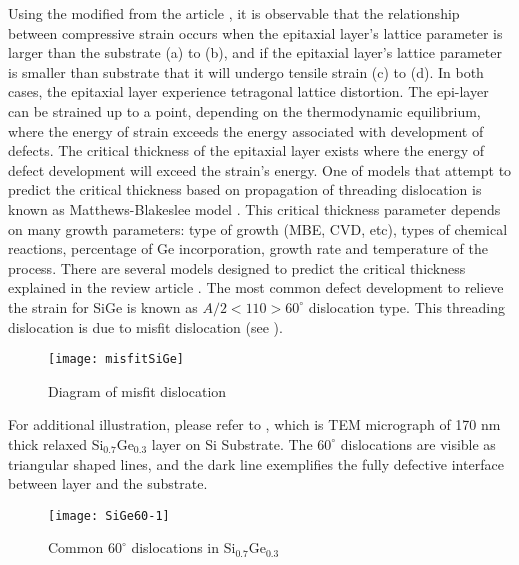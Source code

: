 Using the modified  from the article \cite{Paul1}, it is observable that  the relationship between compressive strain occurs when the epitaxial layer's lattice parameter is larger than the substrate (a) to (b), and if the epitaxial layer's lattice parameter is smaller than substrate that it will undergo tensile strain (c) to (d).  In both cases, the epitaxial layer experience tetragonal lattice distortion.  The epi-layer can be strained up to a point, depending on the thermodynamic equilibrium, where the energy of strain exceeds the energy associated with development of defects.  The critical thickness of the epitaxial layer exists where the energy of defect development will exceed the strain's energy.  One of models that attempt to predict the critical thickness based on propagation of threading dislocation is known as Matthews-Blakeslee model \cite{Matthews1,Matthews2,Matthews3}.  This critical thickness parameter depends on many growth parameters:  type of growth (MBE, CVD, etc), types of chemical reactions, percentage of Ge incorporation, growth rate and temperature of the process.  There are several models designed to predict the critical thickness explained in the review article \cite{Paul1}.  The most common defect development to relieve the strain for SiGe is known as \emph{$A/2<110> 60^{\circ}$} dislocation type.  This threading dislocation is due to misfit dislocation (see ).
\begin{figure}[h]
\caption{Diagram of misfit dislocation \cite{Fig2-4}}
\label{misfitSiGe}
\begin{minipage}{\linewidth}
\centering
\texttt{[image: misfitSiGe]}
\end{minipage}
\end{figure}

For additional illustration, please refer to , which is TEM micrograph of 170 nm thick relaxed Si$_{0.7}$Ge$_{0.3}$ layer on Si Substrate. The $60^{\circ}$ dislocations are visible as triangular shaped lines, and the dark line exemplifies the fully defective interface between layer and the substrate.

\begin{figure}[h]
\caption{Common $60^{\circ}$ dislocations in Si$_{0.7}$Ge$_{0.3}$ }
\label{SiGe60-1}
\begin{minipage}{\linewidth}
\centering
\texttt{[image: SiGe60-1]}
\end{minipage}
\end{figure}


